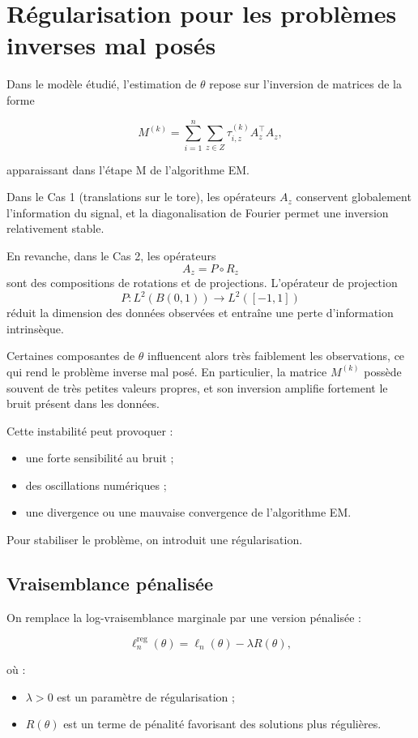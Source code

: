 \documentclass[12pt, a4paper]{article}
\theoremstyle{definition}
\begin{document}
\newpage
\section{Régularisation pour les problèmes inverses mal posés}

Dans le modèle étudié, l’estimation de $\theta$ repose sur l’inversion de matrices de la forme

\[
M^{(k)}
=
\sum_{i=1}^n
\sum_{z\in Z}
\tau_{i,z}^{(k)}
A_z^\top A_z,
\]

apparaissant dans l’étape M de l’algorithme EM.

Dans le Cas 1 (translations sur le tore), les opérateurs $A_z$ conservent globalement l’information du signal, et la diagonalisation de Fourier permet une inversion relativement stable.

En revanche, dans le Cas 2, les opérateurs
\[
A_z = P\circ R_z
\]
sont des compositions de rotations et de projections. L’opérateur de projection
\[
P : L^2(B(0,1)) \to L^2([-1,1])
\]
réduit la dimension des données observées et entraîne une perte d’information intrinsèque.

Certaines composantes de $\theta$ influencent alors très faiblement les observations, ce qui rend le problème inverse mal posé. En particulier, la matrice $M^{(k)}$ possède souvent de très petites valeurs propres, et son inversion amplifie fortement le bruit présent dans les données.

Cette instabilité peut provoquer :
\begin{itemize}
\item une forte sensibilité au bruit ;
\item des oscillations numériques ;
\item une divergence ou une mauvaise convergence de l’algorithme EM.
\end{itemize}

Pour stabiliser le problème, on introduit une régularisation.

\subsection{Vraisemblance pénalisée}

On remplace la log-vraisemblance marginale par une version pénalisée :

\[
\ell_n^{\mathrm{reg}}(\theta)
=
\ell_n(\theta)-\lambda R(\theta),
\]

où :
\begin{itemize}
\item $\lambda>0$ est un paramètre de régularisation ;
\item $R(\theta)$ est un terme de pénalité favorisant des solutions plus régulières.
\end{itemize}
\end{document}
